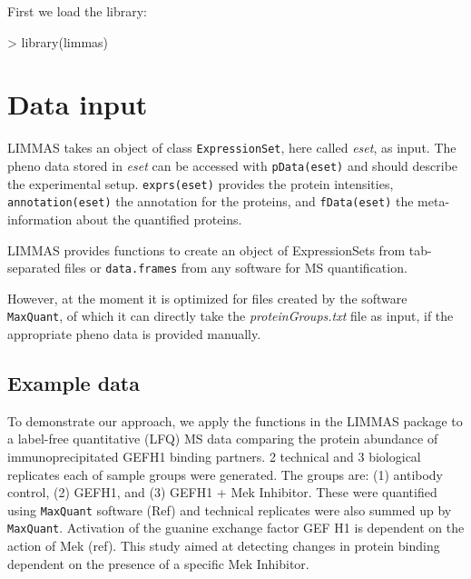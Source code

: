 \documentclass[a4paper,11pt]{article}
\newcommand{\Robject}[1]{{\texttt{#1}}}
\newcommand{\Rfunction}[1]{{\texttt{#1}}}
\begin{document}
First we load the library:
\begin{Schunk}
\begin{Sinput}
> library(limmas)
\end{Sinput}
\end{Schunk}

\section{Data input}
 
LIMMAS takes an object of class \Robject{ExpressionSet}, here called \emph{eset}, as input. The pheno data stored in \emph{eset} can be accessed with \Rfunction{pData(eset)} and should describe the experimental setup. \Rfunction{exprs(eset)} provides the protein intensities, \Rfunction{annotation(eset)} the annotation for the proteins, and \Rfunction{fData(eset)} the meta-information about the quantified proteins.

LIMMAS provides functions to create an object of ExpressionSets from tab-separated files or \Robject{data.frames} from any software for MS quantification. 

However, at the moment it is optimized for files created by the software \texttt{MaxQuant}, of which it can directly take the \emph{proteinGroups.txt} file as input, if the appropriate pheno data is provided manually.

\subsection{Example data}
 
To demonstrate our approach, we apply the functions in the LIMMAS package to a label-free quantitative (LFQ) MS data
comparing the protein abundance of immunoprecipitated GEFH1 binding partners. 2 technical and 3 biological 
replicates each of sample groups were generated. The groups are: (1) antibody control, (2) GEFH1, and (3) GEFH1 + Mek 
Inhibitor. These were quantified using \texttt{MaxQuant} software (Ref) and technical replicates were also summed up by 
\texttt{MaxQuant}. Activation of the guanine exchange factor GEF H1 is dependent on the action of Mek (ref). This study aimed at detecting changes in protein binding dependent on the presence of a specific Mek Inhibitor.
\end{document}

